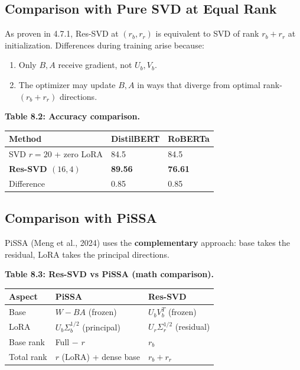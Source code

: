 \subsection{Comparison with Pure SVD at Equal Rank}

As proven in  4.7.1, Res-SVD at $(r_b, r_r)$ is equivalent to SVD of 
rank $r_b + r_r$ at initialization. Differences during training arise 
because:

\begin{enumerate}
\item Only $B, A$ receive gradient, not $U_b, V_b$.
\item The optimizer may update $B, A$ in ways that diverge from optimal
  rank-$(r_b + r_r)$ directions.

\end{enumerate}
\textbf{Table 8.2: Accuracy comparison.}

\begin{table}[H]
\centering
\small
\begin{tabular}{lll}
\toprule
\textbf{Method} & \textbf{DistilBERT} & \textbf{RoBERTa} \\
\midrule
SVD $r=20$ + zero LoRA & 84.5 & 84.5 \\
\textbf{Res-SVD $(16, 4)$} & \textbf{89.56} & \textbf{76.61} \\
Difference & 0.85 & 0.85 \\
\bottomrule
\end{tabular}
\end{table}

\subsection{Comparison with PiSSA}

PiSSA (Meng et al., 2024) uses the \textbf{complementary} approach: base takes 
the residual, LoRA takes the principal directions. 

\textbf{Table 8.3: Res-SVD vs PiSSA (math comparison).}

\begin{table}[H]
\centering
\small
\begin{tabular}{lll}
\toprule
\textbf{Aspect} & \textbf{PiSSA} & \textbf{Res-SVD} \\
\midrule
Base & $W - BA$ (frozen) & $U_b V_b^T$ (frozen) \\
LoRA & $U_b \Sigma_b^{1/2}$ (principal) & $U_r \Sigma_r^{1/2}$ (residual) \\
Base rank & Full $-$ $r$ & $r_b$ \\
Total rank & $r$ (LoRA) + dense base & $r_b + r_r$ \\
\bottomrule
\end{tabular}
\end{table}

